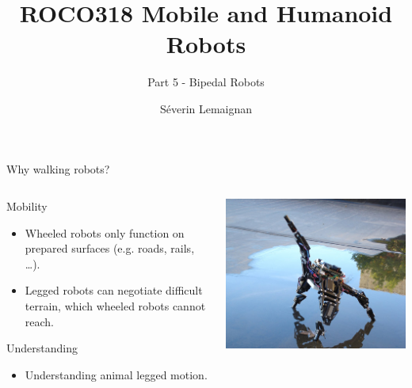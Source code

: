 \documentclass[compress]{beamer}
\title{ROCO318 \newline Mobile and Humanoid Robots}
\subtitle{Part 5 - Bipedal Robots}
\date{}
\author{Séverin Lemaignan}
\institute{Centre for Neural Systems and Robotics\\{\bf Plymouth University}}
\begin{document}

\maketitle

\begin{frame}{Why walking robots?}
    \begin{columns}
        \begin{column}{0.5\linewidth}
    Mobility

    \begin{itemize}

        \item Wheeled robots only function on prepared surfaces (e.g. roads, rails,
            \ldots{}).
        \item Legged robots can negotiate difficult terrain, which wheeled robots
            cannot reach.
    \end{itemize}

    Understanding

    \begin{itemize}

        \item Understanding animal legged motion.
    \end{itemize}
            
        \end{column}
        \begin{column}{0.5\linewidth}
            \begin{center}
                \includegraphics[width=0.8\linewidth]{image1}


\end{center}
\end{column}
\end{columns}
\end{frame}
\end{document}
